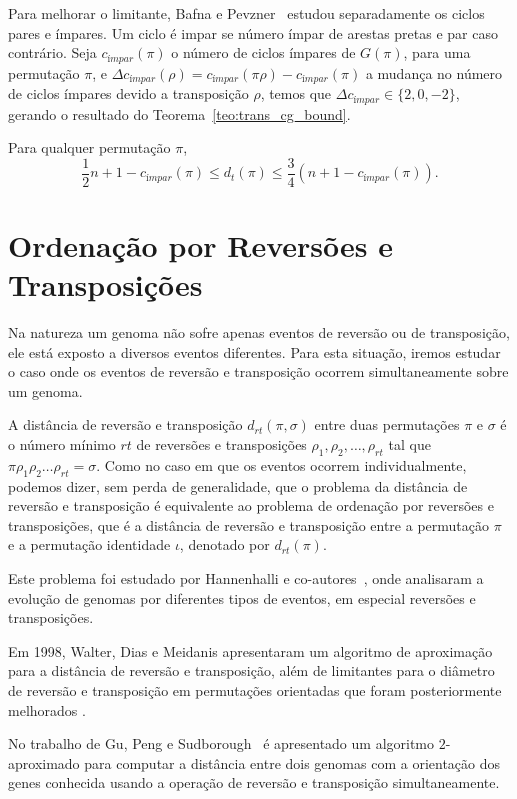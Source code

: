 Para melhorar o limitante, Bafna e Pevzner~\cite{BafnaPevzner*1998}
estudou separadamente os ciclos pares e ímpares. Um ciclo é impar se
número ímpar de arestas pretas e par caso contrário. Seja
$c_{ímpar}(\pi)$ o número de ciclos ímpares de $G(\pi)$, para uma
permutação $\pi$, e $\Delta c_{ímpar} (\rho) = c_{ímpar} (\pi \rho) -
c_{ímpar} (\pi)$ a mudança no número de ciclos ímpares devido a
transposição $\rho$, temos que $\Delta c_{ímpar} \in \{2, 0, -2\}$,
gerando o resultado do Teorema~\ref{teo:trans_cg_bound}.

\begin{teo} 
  \label{teo:trans_cg_bound} 
  Para qualquer permutação $\pi$, 
  \[ 
  \frac{1}{2}n + 1 - c_{ímpar}(\pi) \leq d_t(\pi) \leq \frac{3}{4} (n
  + 1 - c_{ímpar}(\pi)).
  \]
\end{teo}

\section{Ordenação por Reversões e Transposições}
\label{sec:rev_trans}
Na natureza um genoma não sofre apenas eventos de reversão ou de
transposição, ele está exposto a diversos eventos diferentes. Para
esta situação, iremos estudar o caso onde os eventos de reversão e
transposição ocorrem simultaneamente sobre um genoma.

A distância de reversão e transposição $d_{rt}(\pi, \sigma)$ entre
duas permutações $\pi$ e $\sigma$ é o número mínimo $rt$ de reversões
e transposições $\rho_{1}, \rho_{2}, \ldots, \rho_{rt}$ tal que
$\pi \rho_{1} \rho_{2} \ldots \rho_{rt} = \sigma$. Como no caso em que
os eventos ocorrem individualmente, podemos dizer, sem perda de
generalidade, que o problema da distância de reversão e transposição é
equivalente ao problema de ordenação por reversões e transposições,
que é a distância de reversão e transposição entre a permutação $\pi$ e a
permutação identidade $\iota$, denotado por $d_{rt}(\pi)$.

Este problema foi estudado por Hannenhalli e
co-autores~\cite{HannenhalliChappeyKooninPevzner*1995}, onde
analisaram a evolução de genomas por diferentes tipos de eventos, em
especial reversões e transposições. 

Em 1998, Walter, Dias e Meidanis \cite{WalterDiasMeidanis*1998}
apresentaram um algoritmo de aproximação para a distância de reversão
e transposição, além de limitantes para o diâmetro de reversão e
transposição em permutações orientadas que foram posteriormente
melhorados \cite{MeidanisWalterDias*2002}.

No trabalho de Gu, Peng e Sudborough~\cite{GuPengSudbourough*1999} é
apresentado um algoritmo $2$-aproximado para computar a distância
entre dois genomas com a orientação dos genes conhecida usando a
operação de reversão e transposição simultaneamente.
